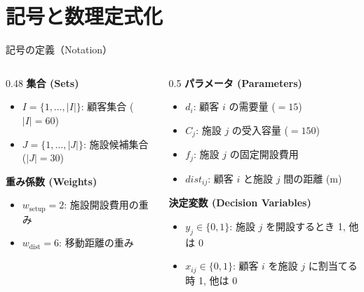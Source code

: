 \documentclass[aspectratio=169,11pt]{beamer}
\begin{document}
\section{記号と数理定式化}

\begin{frame}{記号の定義（Notation）}
  \begin{columns}[T]
    \begin{column}{0.48\textwidth}
      \textbf{集合 (Sets)}
      \begin{itemize}\small
        \item $I = \{1, \dots, |I|\}$: 顧客集合 ($|I|=60$)
        \item $J = \{1, \dots, |J|\}$: 施設候補集合 ($|J|=30$)
      \end{itemize}
      \vspace{0.4em}
      \textbf{重み係数 (Weights)}
      \begin{itemize}\small
        \item $w_{\text{setup}} = 2$: 施設開設費用の重み
        \item $w_{\text{dist}} = 6$: 移動距離の重み
      \end{itemize}
    \end{column}
    \begin{column}{0.5\textwidth}
      \textbf{パラメータ (Parameters)}
      \begin{itemize}\small
        \item $d_i$: 顧客 $i$ の需要量 ($=15$)
        \item $C_j$: 施設 $j$ の受入容量 ($=150$)
        \item $f_j$: 施設 $j$ の固定開設費用
        \item $dist_{ij}$: 顧客 $i$ と施設 $j$ 間の距離 (m)
      \end{itemize}
      \vspace{0.4em}
      \textbf{決定変数 (Decision Variables)}
      \begin{itemize}\small
        \item $y_j \in \{0, 1\}$: 施設 $j$ を開設するとき 1, 他は 0
        \item $x_{ij} \in \{0, 1\}$: 顧客 $i$ を施設 $j$ に割当てる時 1, 他は 0
      \end{itemize}
    \end{column}
  \end{columns}
\end{frame}
\end{document}

